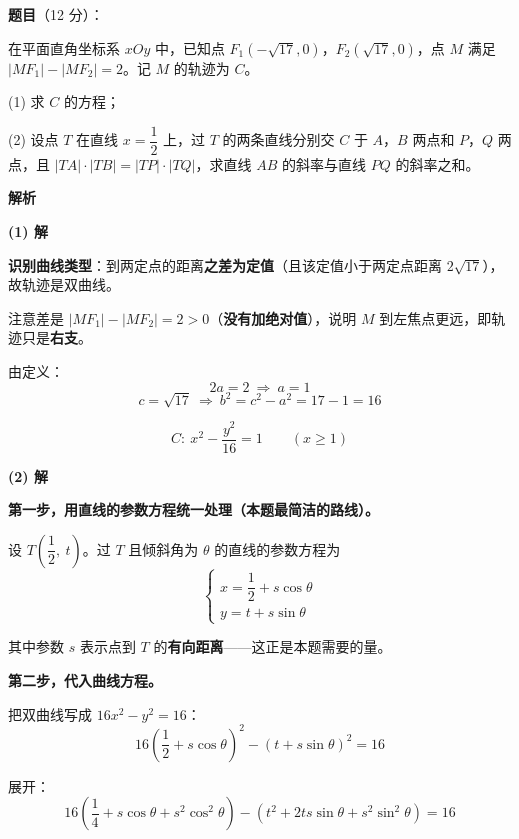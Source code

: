 \begin{answer}

\textbf{题目}（12 分）：

在平面直角坐标系 $xOy$ 中，已知点 $F_1\left(-\sqrt{17},0\right)$，$F_2\left(\sqrt{17},0\right)$，点 $M$ 满足 $\left|MF_1\right|-\left|MF_2\right|=2$。记 $M$ 的轨迹为 $C$。

  (1) 求 $C$ 的方程；

  (2) 设点 $T$ 在直线 $x=\dfrac12$ 上，过 $T$ 的两条直线分别交 $C$ 于 $A$，$B$ 两点和 $P$，$Q$ 两点，且 $|TA|\cdot|TB|=|TP|\cdot|TQ|$，求直线 $AB$ 的斜率与直线 $PQ$ 的斜率之和。

\textbf{解析}

\par\medskip

\textbf{(1) 解}

\textbf{识别曲线类型}：到两定点的距离\textbf{之差为定值}（且该定值小于两定点距离 $2\sqrt{17}$），故轨迹是双曲线。

注意差是 $\left|MF_1\right|-\left|MF_2\right|=2>0$（\textbf{没有加绝对值}），说明 $M$ 到左焦点更远，即轨迹只是\textbf{右支}。

由定义：
\nopagebreak[4]
\[2a=2\ \Longrightarrow\ a=1\]
\nopagebreak[4]
\[c=\sqrt{17}\ \Longrightarrow\ b^{2}=c^{2}-a^{2}=17-1=16\]

\nopagebreak[4]
\[C:\ x^{2}-\frac{y^{2}}{16}=1\qquad(x\ge1)\]

\par\medskip

\textbf{(2) 解}

\textbf{第一步，用直线的参数方程统一处理（本题最简洁的路线）。}

设 $T\left(\dfrac12,\ t\right)$。过 $T$ 且倾斜角为 $\theta$ 的直线的参数方程为
\nopagebreak[4]
\[\begin{cases}x=\dfrac12+s\cos\theta\\ y=t+s\sin\theta\end{cases}\]

其中参数 $s$ 表示点到 $T$ 的\textbf{有向距离}——这正是本题需要的量。

\textbf{第二步，代入曲线方程。}

把双曲线写成 $16x^{2}-y^{2}=16$：
\nopagebreak[4]
\[16\left(\frac12+s\cos\theta\right)^{2}-\left(t+s\sin\theta\right)^{2}=16\]

展开：
\nopagebreak[4]
\[16\left(\frac14+s\cos\theta+s^{2}\cos^{2}\theta\right)-\left(t^{2}+2ts\sin\theta+s^{2}\sin^{2}\theta\right)=16\]


\end{answer}
